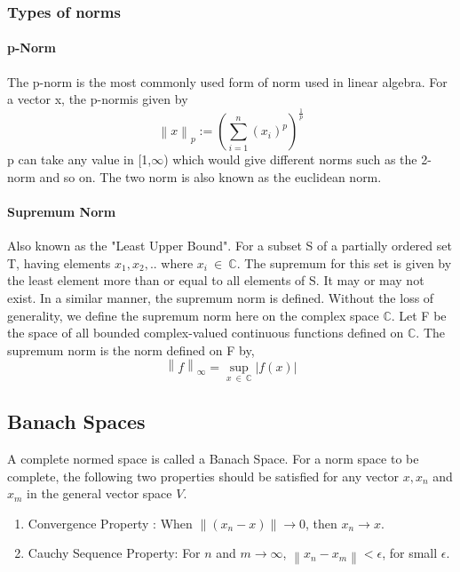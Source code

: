 \documentclass[a4paper,12pt]{article}
\newcommand\norm[1]{\left\lVert#1\right\rVert}
\begin{document}
		\subsubsection{Types of norms}
			\paragraph{p-Norm} The p-norm is the most commonly used form of norm used in linear algebra. For a vector x, the p-normis given by
				\begin{equation}
					\norm{x}_{p} := \left(\sum\limits_{i=1}^n  (x_{i})^{p}\right)^{\frac{1}{p}}
				\end{equation}
				p can take any value in [1,$\infty$) which would give different norms such as the 2-norm and so on. The two norm is also known as the euclidean norm.
			\paragraph{Supremum Norm} Also known as the "Least Upper Bound". For a subset S of a partially ordered set T, having elements ${x_{1},x_{2},..}$ where $x_{i}\:\in \:\mathbb{C}$. The supremum for this set is given by the least element more than or equal to all elements of S. It may or may not exist. In a similar manner, the supremum norm is defined. Without the loss of generality, we define the supremum norm here on the complex space $\mathbb{C}$. Let F be the space of all bounded complex-valued continuous functions defined on $\mathbb{C}$. The supremum norm is the norm defined on F by,
			\begin{equation}
				\norm{f}_{\infty}=\sup_{x\: \in \:\mathbb{C}} |f(x)|
			\end{equation}
		
	\subsection{Banach Spaces}
	A complete normed space is called a Banach Space. For a norm space to be complete, the following two properties should be satisfied for any vector $x, x_{n}$ and $x_{m}$ in the general vector space $V$.
		\begin{enumerate}
			\item Convergence Property : When $\norm{(x_{n} -x)}\rightarrow 0$, then $x_{n} \rightarrow x$.
			\item Cauchy Sequence Property: For $n$ and $m \rightarrow \infty$, $\norm{x_{n}-x_{m}} < \epsilon$, for small $\epsilon$. 		\end{enumerate}
	
\end{document}
